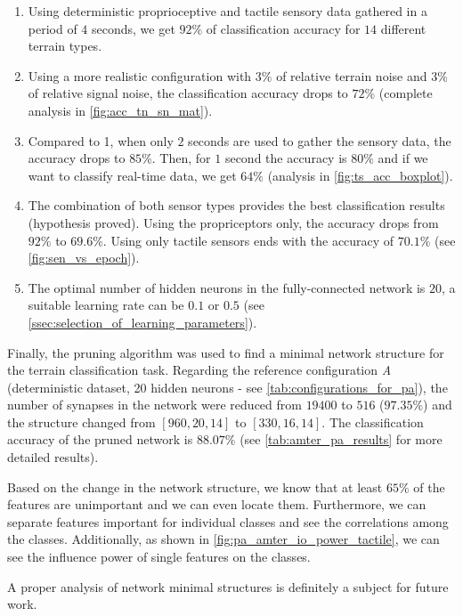 \begin{enumerate}
\item Using deterministic proprioceptive and tactile sensory data gathered in a period of $ 4 $ seconds, we get $ 92\% $ of classification accuracy for $ 14 $ different terrain types.
\item Using a more realistic configuration with $ 3\% $ of relative terrain noise and $ 3\% $ of relative signal noise, the classification accuracy drops to $ 72\% $ (complete analysis in \cref{fig:acc_tn_sn_mat}).
\item Compared to 1, when only $ 2 $ seconds are used to gather the sensory data, the accuracy drops to $ 85\% $. Then, for $ 1 $ second the accuracy is $ 80\% $ and if we want to classify real-time data, we get $ 64\% $ (analysis in \cref{fig:ts_acc_boxplot}).
\item The combination of both sensor types provides the best classification results (hypothesis proved). Using the propriceptors only, the accuracy drops from $ 92\% $ to $69.6\%$. Using only tactile sensors ends with the accuracy of $ 70.1\% $ (see \cref{fig:sen_vs_epoch}).
\item The optimal number of hidden neurons in the fully-connected network is $ 20 $, a suitable learning rate can be $ 0.1 $ or $ 0.5 $ (see \cref{ssec:selection_of_learning_parameters}).
\end{enumerate}

Finally, the pruning algorithm was used to find a minimal network structure for the terrain classification task. Regarding the reference configuration \textit{A} (deterministic dataset, 20 hidden neurons - see \ref{tab:configurations_for_pa}), the number of synapses in the network were reduced from $ 19400 $ to $ 516 $ ($ 97.35\% $) and the structure changed from $ [960, 20, 14] $ to $ [330, 16, 14] $. The classification accuracy of the pruned network is $ 88.07\% $ (see \cref{tab:amter_pa_results} for more detailed results).

Based on the change in the network structure, we know that at least $ 65\% $ of the features are unimportant and we can even locate them. Furthermore, we can separate features important for individual classes and see the correlations among the classes. Additionally, as shown in \cref{fig:pa_amter_io_power_tactile}, we can see the influence power of single features on the classes.

A proper analysis of network minimal structures is definitely a subject for future work.

